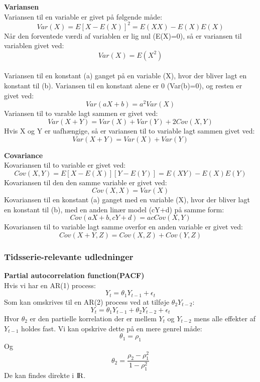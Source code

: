 \documentclass[
  10pt,
]{article}
\begin{document}
\textbf{Variansen}\\
Variansen til en variable er givet på følgende måde:\\
\[Var(X) = E[X-E(X)]^2 = E(XX) - E(X)E(X) \] Når den forventede værdi af
variablen er lig nul (E(X)=0), så er variansen til variablen givet
ved:\\
\[Var(X) = E(X^2) \]\\
Variansen til en konstant (a) ganget på en variable (X), hvor der bliver
lagt en konstant til (b). Variansen til en konstant alene er 0
(Var(b)=0), og resten er givet ved:\\
\[Var(aX + b) = a^2Var(X) \] Variansen til to varable lagt sammen er
givet ved:\\
\[Var(X + Y) = Var(X) + Var(Y) + 2Cov(X,Y) \] Hvis X og Y er uafhængige,
så er variansen til to variable lagt sammen givet ved:\\
\[Var(X+Y) = Var(X) + Var(Y) \]

\newpage

\textbf{Covariance}\\
Kovariansen til to variable er givet ved:\\
\[Cov(X,Y) = E[X-E(X)][Y-E(Y)]=E(XY)-E(X)E(Y)\] Kovariansen til den den
samme variable er givet ved:\\
\[Cov(X,X) = Var(X) \] Kovariansen til en konstant (a) ganget med en
variable (X), hvor der bliver lagt en konstant til (b), med en anden
linær model (cY+d) på samme form:\\
\[Cov(aX+b,cY+d) = acCov(X,Y) \] Kovariansen til to variable lagt samme
overfor en anden variable er givet ved:\\
\[Cov(X+Y,Z) = Cov(X,Z) + Cov(Y,Z) \]

\newpage

\hypertarget{tidsserie-relevante-udledninger}{%
\subsubsection{Tidsserie-relevante
udledninger}\label{tidsserie-relevante-udledninger}}

\textbf{Partial autocorrelation function(PACF)}\\
Hvis vi har en AR(1) process:\\
\[Y_t = \theta_1 Y_{t-1} + \epsilon_t \] Som kan omskrives til en AR(2)
process ved at tilføje \(\theta_2 Y_{t-2}\):
\[Y_t = \theta_1 Y_{t-1} + \theta_2 Y_{t-2} + \epsilon_t \] Hvor
\(\theta_2\) er den partielle korrelation der er mellem \(Y_t\) og
\(Y_{t-2}\) mens alle effekter af \(Y_{t-1}\) holdes fast. Vi kan
opskrive dette på en mere genrel måde:\\
\[\theta_1 = \rho_1 \] Og
\[\theta_2 = \frac{\rho_2 - \rho_1^2}{1-\rho_1^2} \] De kan findes
direkte i \({\rm I\!R}\).\\
\end{document}

